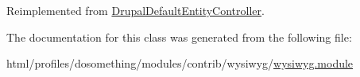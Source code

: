 Reimplemented from \hyperlink{classDrupalDefaultEntityController_a68735c41d2ba655a073c64983754edf7}{DrupalDefaultEntityController}.

The documentation for this class was generated from the following file:\begin{DoxyCompactItemize}
\item 
html/profiles/dosomething/modules/contrib/wysiwyg/\hyperlink{wysiwyg_8module}{wysiwyg.module}\end{DoxyCompactItemize}
